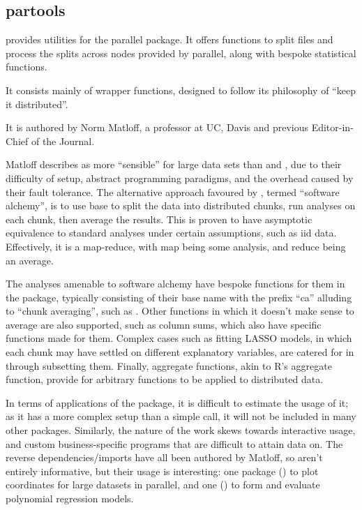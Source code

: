 \subsection{partools}\label{subsec:partools}

 provides utilities for the parallel
package\cite{matloff16softw_alchemy}.
It offers functions to split files and process the splits across nodes provided by parallel, along with bespoke statistical functions.

It consists mainly of wrapper functions, designed to follow its philosophy of ``keep it distributed''.

It is authored by Norm Matloff, a professor at UC, Davis and previous Editor-in-Chief of the \R{} Journal.

Matloff describes  as more ``sensible'' for large data sets than  and , due to their difficulty of setup, abstract programming paradigms, and the overhead caused by their fault tolerance.
The alternative approach favoured by , termed ``software alchemy'', is to use base \R{} to split the data into distributed chunks, run analyses on each chunk, then average the results.
This is proven to have asymptotic equivalence to standard analyses under certain assumptions, such as iid data.
Effectively, it is a map-reduce, with map being some analysis, and reduce being an average.

The analyses amenable to software alchemy have bespoke functions for them in the package, typically consisting of their base \R{} name with the prefix ``ca'' alluding to ``chunk averaging'', such as .
Other functions in which it doesn't make sense to average are also supported, such as column sums, which also have specific functions made for them.
Complex cases such as fitting LASSO models, in which each chunk may have settled on different explanatory variables, are catered for in  through subsetting them.
Finally, aggregate functions, akin to R's aggregate function, provide for arbitrary functions to be applied to distributed data.

In terms of applications of the package, it is difficult to estimate the usage of it; as it has a more complex setup than a simple  call, it will not be included in many other packages.
Similarly, the nature of the work skews towards interactive usage, and custom business-specific programs that are difficult to attain data on.
The reverse dependencies/imports have all been authored by Matloff, so aren't entirely informative, but their usage is interesting: one package () to plot coordinates for large datasets in parallel, and one () to form and evaluate polynomial regression models.

